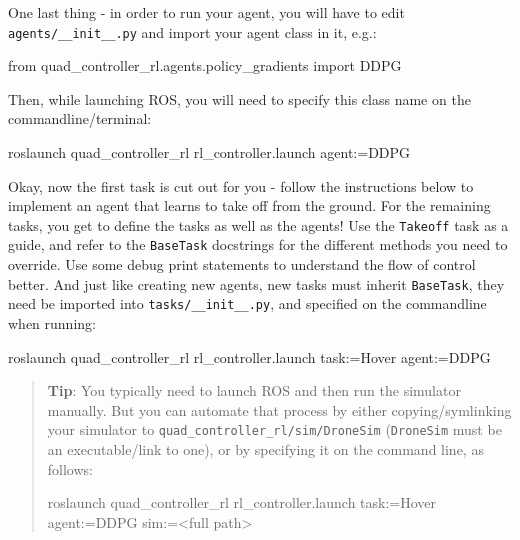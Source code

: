 \documentclass[11pt]{article}
\newenvironment{Shaded}{}{}
\newcommand{\NormalTok}[1]{{#1}}
\newcommand{\ImportTok}[1]{{#1}}
\newcommand{\OperatorTok}[1]{\textcolor[rgb]{0.40,0.40,0.40}{{#1}}}
\newcommand{\ExtensionTok}[1]{{#1}}
\begin{document}
One last thing - in order to run your agent, you will have to edit
\texttt{agents/\_\_init\_\_.py} and import your agent class in it, e.g.:

\begin{Shaded}
\begin{Highlighting}[]
\ImportTok{from}\NormalTok{ quad_controller_rl.agents.policy_gradients }\ImportTok{import}\NormalTok{ DDPG}
\end{Highlighting}
\end{Shaded}

Then, while launching ROS, you will need to specify this class name on
the commandline/terminal:

\begin{Shaded}
\begin{Highlighting}[]
\ExtensionTok{roslaunch}\NormalTok{ quad_controller_rl rl_controller.launch agent:=DDPG}
\end{Highlighting}
\end{Shaded}

Okay, now the first task is cut out for you - follow the instructions
below to implement an agent that learns to take off from the ground. For
the remaining tasks, you get to define the tasks as well as the agents!
Use the \texttt{Takeoff} task as a guide, and refer to the
\texttt{BaseTask} docstrings for the different methods you need to
override. Use some debug print statements to understand the flow of
control better. And just like creating new agents, new tasks must
inherit \texttt{BaseTask}, they need be imported into
\texttt{tasks/\_\_init\_\_.py}, and specified on the commandline when
running:

\begin{Shaded}
\begin{Highlighting}[]
\ExtensionTok{roslaunch}\NormalTok{ quad_controller_rl rl_controller.launch task:=Hover agent:=DDPG}
\end{Highlighting}
\end{Shaded}

\begin{quote}
\textbf{Tip}: You typically need to launch ROS and then run the
simulator manually. But you can automate that process by either
copying/symlinking your simulator to
\texttt{quad\_controller\_rl/sim/DroneSim} (\texttt{DroneSim} must be an
executable/link to one), or by specifying it on the command line, as
follows:

\begin{Shaded}
\begin{Highlighting}[]
\ExtensionTok{roslaunch}\NormalTok{ quad_controller_rl rl_controller.launch task:=Hover agent:=DDPG sim:=}\OperatorTok{<}\NormalTok{full path}\OperatorTok{>}
\end{Highlighting}
\end{Shaded}
\end{quote}
\end{document}
